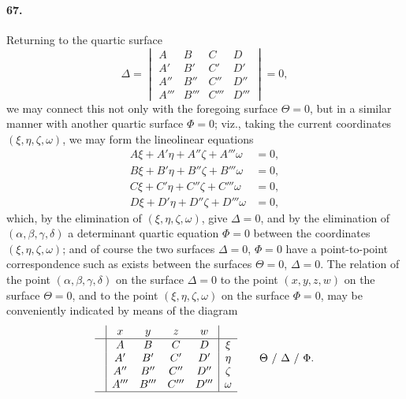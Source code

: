 \documentclass[11pt,a4paper]{article}
\begin{document}
\medskip

\paragraph{67.}
Returning to the quartic surface
\[
\Delta = \begin{vmatrix} A & B & C & D\\ A' & B' & C' & D'\\
A'' & B'' & C'' & D''\\ A''' & B''' & C''' & D''' \end{vmatrix} = 0,
\]
we may connect this not only with the foregoing surface $\Theta = 0$, but in a
similar manner with another quartic surface $\Phi = 0$; viz., taking the current
coordinates $(\xi, \eta, \zeta, \omega)$, we may form the lineolinear equations
\begin{align*}
A\xi + A'\eta + A''\zeta + A'''\omega &= 0,\\
B\xi + B'\eta + B''\zeta + B'''\omega &= 0,\\
C\xi + C'\eta + C''\zeta + C'''\omega &= 0,\\
D\xi + D'\eta + D''\zeta + D'''\omega &= 0,
\end{align*}
which, by the elimination of $(\xi, \eta, \zeta, \omega)$, give $\Delta = 0$, and
by the elimination of $(\alpha, \beta, \gamma, \delta)$ a determinant quartic
equation $\Phi = 0$ between the coordinates $(\xi, \eta, \zeta, \omega)$; and of
course the two surfaces $\Delta = 0$, $\Phi = 0$ have a point-to-point
correspondence such as exists between the surfaces $\Theta = 0$, $\Delta = 0$. The
relation of the point $(\alpha, \beta, \gamma, \delta)$ on the surface $\Delta = 0$
to the point $(x, y, z, w)$ on the surface $\Theta = 0$, and to the point
$(\xi, \eta, \zeta, \omega)$ on the surface $\Phi = 0$, may be conveniently indicated
by means of the diagram
\[
\begin{array}{c|cccc|c}
& x & y & z & w &\\ \hline
& A & B & C & D & \xi\\
& A' & B' & C' & D' & \eta\\
& A'' & B'' & C'' & D'' & \zeta\\
& A''' & B''' & C''' & D''' & \omega\\ \hline
\end{array} \qquad \Theta\ /\ \Delta\ /\ \Phi.
\]

\medskip
\end{document}
